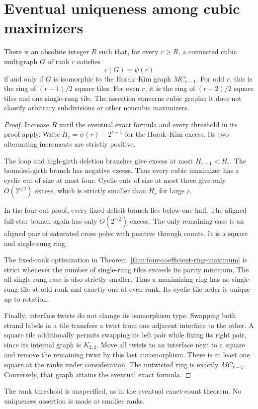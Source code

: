 \section{Eventual uniqueness among cubic maximizers}
\label{sec:four-coefficient-uniqueness}

\begin{corollary}
\label{cor:four-eventual-cubic-uniqueness}
There is an absolute integer $R$ such that, for every $r\ge R$, a connected cubic multigraph $G$ of rank $r$ satisfies
\[
 c(G)=\psi(r)
\]
if and only if $G$ is isomorphic to the Horak--Kim graph $MC_{r-1}$.
For odd $r$, this is the ring of $(r-1)/2$ square tiles.
For even $r$, it is the ring of $(r-2)/2$ square tiles and one single-rung tile.
The assertion concerns cubic graphs; it does not classify arbitrary subdivisions or other noncubic maximizers.
\end{corollary}

\begin{proof}
Increase $R$ until the eventual exact formula and every threshold in its proof apply.
Write $H_r=\psi(r)-2^{r-1}$ for the Horak--Kim excess.
Its two alternating increments are strictly positive.

The loop and high-girth deletion branches give excess at most $H_{r-1}<H_r$.
The bounded-girth branch has negative excess.
Thus every cubic maximizer has a cyclic cut of size at most four.
Cyclic cuts of size at most three give only $O(2^{r/2})$ excess, which is strictly smaller than $H_r$ for large $r$.

In the four-cut proof, every fixed-deficit branch lies below one half.
The aligned full-star branch again has only $O(2^{r/2})$ excess.
The only remaining case is an aligned pair of saturated cross poles with positive through counts.
It is a square and single-rung ring.

The fixed-rank optimization in Theorem~\ref{thm:four-coefficient-ring-maximum} is strict whenever the number of single-rung tiles exceeds its parity minimum.
The all-single-rung case is also strictly smaller.
Thus a maximizing ring has no single-rung tile at odd rank and exactly one at even rank.
Its cyclic tile order is unique up to rotation.

Finally, interface twists do not change its isomorphism type.
Swapping both strand labels in a tile transfers a twist from one adjacent interface to the other.
A square tile additionally permits swapping its left pair while fixing its right pair, since its internal graph is $K_{2,2}$.
Move all twists to an interface next to a square and remove the remaining twist by this last automorphism.
There is at least one square at the ranks under consideration.
The untwisted ring is exactly $MC_{r-1}$.
Conversely, that graph attains the eventual exact formula.
\end{proof}

The rank threshold is unspecified, as in the eventual exact-count theorem.
No uniqueness assertion is made at smaller ranks.
